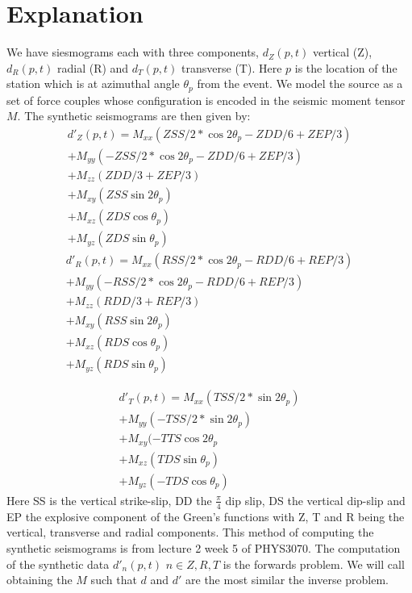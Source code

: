 \documentclass{article}
\begin{document}
\section*{Explanation}
We have siesmograms each with three components, $d_Z(p,t)$ vertical (Z), $d_R(p,t)$ radial (R) and $d_T(p, t)$ transverse (T). Here $p$ is the location of the station which is at azimuthal angle $\theta_p$ from the event. We model the source as a set of force couples whose configuration is encoded in the seismic moment tensor $M$. The synthetic seismograms are then given by:
\begin{equation}
	\begin{split}
	d'_Z(p,t) = M_{xx} (ZSS/2 *\cos{2 \theta_p} - ZDD/6 + ZEP/3)
	\\
	+ M_{yy} (-ZSS/2 *\cos{2 \theta_p} - ZDD/6 + ZEP/3) \\
	+ M_{zz} (ZDD/3 + ZEP/3) \\ 
	+ M_{xy} (ZSS \sin{2 \theta_p}) \\ 
	+ M_{xz} (ZDS \cos{\theta_p}) \\ 
	+ M_{yz} (ZDS \sin{\theta_p})
	\end{split}
\end{equation}
\begin{equation}
	\begin{split}
	d'_R(p,t) = M_{xx} (RSS/2 * \cos{2 \theta_p} - RDD/6 + REP/3) \\
	+ M_{yy} (-RSS/2 * \cos{2 \theta_p} - RDD/6 + REP/3  ) \\
	+ M_{zz} (RDD/3 + REP/3) \\
	+ M_{xy} (RSS\sin{2 \theta_p})\\
	+ M_{xz} (RDS \cos{\theta_p}) \\
	+ M_{yz} (RDS \sin{\theta_p})
	\end{split}
\end{equation}

\begin{equation}
	\begin{split}
	d'_T(p,t) = M_{xx} (TSS/2 * \sin{2 \theta_p}) \\
	+ M_{yy} (-TSS/2 * \sin{2 \theta_p}  ) \\
	+ M_{xy} (-TTS \cos{2 \theta_p} \\
	+ M_{xz} (TDS \sin{\theta_p}) \\
	+ M_{yz} (-TDS \cos{\theta_p})
	\end{split}
\end{equation}
Here SS is the vertical strike-slip, DD the $\frac{\pi}{4}$ dip slip, DS the vertical dip-slip and EP the explosive component of the Green's functions with Z, T and R being the vertical, transverse and radial components. This method of computing the synthetic seismograms is from lecture 2 week 5 of PHYS3070.
\newline
The computation of the synthetic data $d'_{n}(p,t)$ $n\in{Z,R,T}$ is the forwards problem. We will call obtaining the $M$ such that $d$ and $d'$ are the most similar the inverse problem.
\end{document}
